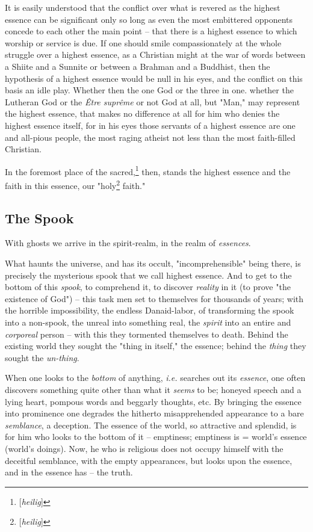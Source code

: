 It is easily understood that the conflict over what is revered as the highest 
essence can be significant only so long as even the most embittered opponents 
concede to each other the main point -- that there is a highest essence to 
which worship or service is due. If one should smile compassionately at the 
whole struggle over a highest essence, as a Christian might at the war of 
words between a Shiite and a Sunnite or between a Brahman and a Buddhist, then 
the hypothesis of a highest essence would be null in his eyes, and the 
conflict on this basis an idle play. Whether then the one God or the three in 
one. whether the Lutheran God or the \textit{\^Etre supr\^eme} or not God at 
all, but "{}Man,"{} may represent the highest essence, that makes no 
difference at all for him who denies the highest essence itself, for in his 
eyes those servants of a highest essence are one and all-pious people, the 
most raging atheist not less than the most faith-filled Christian.

In the foremost place of the sacred,\footnote{[\textit{heilig}]} then, stands 
the highest essence and the faith in this essence, our 
"{}holy\footnote{[\textit{heilig}]} faith."{}

\medskip{}

\subsection[The Spook]{\centering The Spook}

With ghosts we arrive in the spirit-realm, in the realm of \textit{essences}.

What haunts the universe, and has its occult, "{}incomprehensible"{} being 
there, is precisely the mysterious spook that we call highest essence. And to 
get to the bottom of this \textit{spook}, to comprehend it, to discover 
\textit{reality} in it (to prove "{}the existence of God"{}) -- this task men 
set to themselves for thousands of years; with the horrible impossibility, the 
endless Danaid-labor, of transforming the spook into a non-spook, the unreal 
into something real, the \textit{spirit} into an entire and \textit{corporeal} 
person -- with this they tormented themselves to death. Behind the existing 
world they sought the "{}thing in itself,"{} the essence; behind the 
\textit{thing} they sought the \textit{un-thing}.

When one looks to the \textit{bottom} of anything, \textit{i.e.} searches out 
its \textit{essence}, one often discovers something quite other than what it 
\textit{seems} to be; honeyed speech and a lying heart, pompous words and 
beggarly thoughts, etc. By bringing the essence into prominence one degrades 
the hitherto misapprehended appearance to a bare \textit{semblance}, a 
deception. The essence of the world, so attractive and splendid, is for him 
who looks to the bottom of it -- emptiness; emptiness is = world's essence 
(world's doings). Now, he who is religious does not occupy himself with the 
deceitful semblance, with the empty appearances, but looks upon the essence, 
and in the essence has -- the truth.

